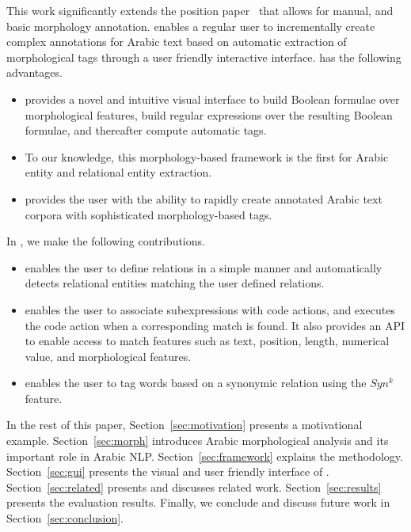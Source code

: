 This work significantly extends the position 
paper~\cite{JaZaMatar} that allows for manual, and 
basic morphology annotation.
\framework enables a regular user to incrementally create 
complex annotations for Arabic text based on automatic 
extraction of morphological tags through a user friendly interactive interface. 
\framework has the following advantages.
\begin{itemize}
  \item \framework provides a novel and intuitive visual interface to build Boolean formulae over morphological features, 
    build regular expressions over the resulting Boolean formulae, and thereafter compute automatic tags.
  \item To our knowledge, this morphology-based framework  is the first for Arabic entity and relational entity extraction.
  \item \framework provides the user with the ability to rapidly create annotated Arabic text corpora with sophisticated morphology-based tags.
\end{itemize}

In \framework, we make the following contributions.
\begin{itemize}
  \item \framework enables the user to define relations in a simple manner
    and automatically detects relational entities matching the user defined relations. 
  \item \framework enables the user to associate subexpressions
    with code actions, and executes the code action 
    when a corresponding match is found. 
    It also provides an API to enable access to match 
    features such as text, position, length, numerical value, and morphological features.
  \item \framework enables the user to tag words based on a synonymic relation using the $Syn^k$ feature.
\end{itemize}



In the rest of this paper,
Section~\ref{sec:motivation} presents a motivational example. 
Section~\ref{sec:morph} introduces Arabic morphological analysis 
and its important role in Arabic NLP. 
Section~\ref{sec:framework} explains the \framework methodology. 
Section~\ref{sec:gui} presents the visual and user friendly interface of \framework. 
Section~\ref{sec:related} presents and discusses related work.
Section~\ref{sec:results} presents the evaluation results. 
Finally, we conclude and discuss future work in Section~\ref{sec:conclusion}.
